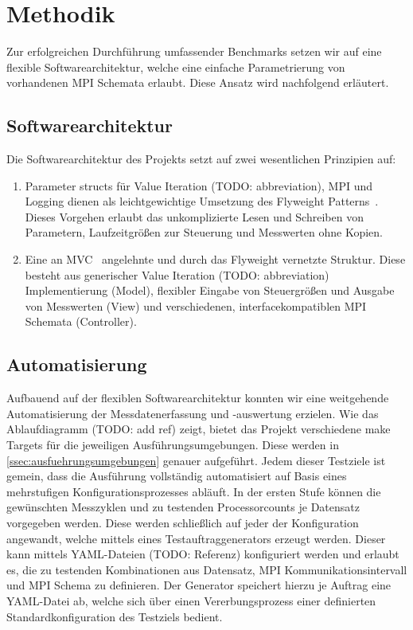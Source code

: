 \section{Methodik}
\label{sec:methodik}

Zur erfolgreichen Durchführung umfassender Benchmarks setzen wir auf eine flexible Softwarearchitektur, welche eine einfache Parametrierung von vorhandenen MPI Schemata erlaubt. Diese Ansatz wird nachfolgend erläutert.

\subsection{Softwarearchitektur}
Die Softwarearchitektur des Projekts setzt auf zwei wesentlichen Prinzipien auf:
\begin{enumerate}
	\item Parameter structs für Value Iteration (TODO: abbreviation), MPI und Logging dienen als leichtgewichtige Umsetzung des Flyweight Patterns~\citep[S.195ff.]{gamma1995design}. Dieses Vorgehen erlaubt das unkomplizierte Lesen und Schreiben von Parametern, Laufzeitgrößen zur Steuerung und Messwerten ohne Kopien.
	\item Eine an MVC~\citep[S.125ff.]{buschmann1996pattern-oriented} angelehnte und durch das Flyweight vernetzte Struktur. Diese besteht aus generischer Value Iteration (TODO: abbreviation) Implementierung (Model), flexibler Eingabe von Steuergrößen und Ausgabe von Messwerten (View) und verschiedenen, interfacekompatiblen MPI Schemata (Controller).
\end{enumerate}

\subsection{Automatisierung}
Aufbauend auf der flexiblen Softwarearchitektur konnten wir eine weitgehende Automatisierung der Messdatenerfassung und -auswertung erzielen. Wie das Ablaufdiagramm (TODO: add ref) zeigt, bietet das Projekt verschiedene make Targets für die jeweiligen Ausführungsumgebungen. Diese werden in \ref{ssec:ausfuehrungsumgebungen} genauer aufgeführt. Jedem dieser Testziele ist gemein, dass die Ausführung vollständig automatisiert auf Basis eines mehrstufigen Konfigurationsprozesses abläuft. In der ersten Stufe können die gewünschten Messzyklen und zu testenden Processorcounts je Datensatz vorgegeben werden. Diese werden schließlich auf jeder der Konfiguration angewandt, welche mittels eines Testauftraggenerators erzeugt werden. Dieser kann mittels YAML-Dateien (TODO: Referenz) konfiguriert werden und erlaubt es, die zu testenden Kombinationen aus Datensatz, MPI Kommunikationsintervall und MPI Schema zu definieren. Der Generator speichert hierzu je Auftrag eine YAML-Datei ab, welche sich über einen Vererbungsprozess einer definierten Standardkonfiguration des Testziels bedient.

